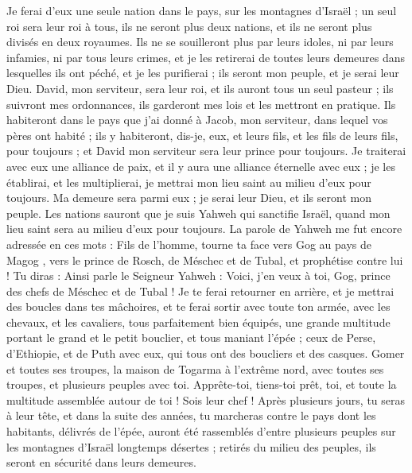 \begin{multicols}{2}
Je ferai d’eux une seule nation dans le pays, sur les montagnes d'Israël ; un seul roi sera leur roi à tous, ils ne seront plus deux nations, et ils ne seront plus divisés en deux royaumes.
Ils ne se souilleront plus par leurs idoles, ni par leurs infamies, ni par tous leurs crimes, et je les retirerai de toutes leurs demeures dans lesquelles ils ont péché, et je les purifierai ; ils seront mon peuple, et je serai leur Dieu.
David, mon serviteur, sera leur roi, et ils auront tous un seul pasteur ; ils suivront mes ordonnances, ils garderont mes lois et les mettront en pratique.
Ils habiteront dans le pays que j'ai donné à Jacob, mon serviteur, dans lequel vos pères ont habité ; ils y habiteront, dis-je, eux, et leurs fils, et les fils de leurs fils, pour toujours ; et David mon serviteur sera leur prince pour toujours.
Je traiterai avec eux une alliance de paix, et il y aura une alliance éternelle avec eux ; je les établirai, et les multiplierai, je mettrai mon lieu saint au milieu d'eux pour toujours.
Ma demeure sera parmi eux ; je serai leur Dieu, et ils seront mon peuple.
Les nations sauront que je suis Yahweh qui sanctifie Israël, quand mon lieu saint sera au milieu d'eux pour toujours.
\VerseOne{}La parole de Yahweh me fut encore adressée en ces mots :
Fils de l’homme, tourne ta face vers Gog au pays de Magog  , vers le prince de Rosch, de Méschec et de Tubal, et prophétise contre lui !
Tu diras : Ainsi parle le Seigneur Yahweh : Voici, j'en veux à toi, Gog, prince des chefs de Méschec et de Tubal !
Je te ferai retourner en arrière, et je mettrai des boucles dans tes mâchoires, et te ferai sortir avec toute ton armée, avec les chevaux, et les cavaliers, tous parfaitement bien équipés, une grande multitude portant le grand et le petit bouclier, et tous maniant l'épée ;
ceux de Perse, d’Ethiopie, et de Puth avec eux, qui tous ont des boucliers et des casques.
Gomer et toutes ses troupes, la maison de Togarma à l’extrême nord, avec toutes ses troupes, et plusieurs peuples avec toi.
Apprête-toi, tiens-toi prêt, toi, et toute la multitude assemblée autour de toi ! Sois leur chef !
Après plusieurs jours, tu seras à leur tête, et dans la suite des années, tu marcheras contre le pays dont les habitants, délivrés de l’épée, auront été rassemblés d’entre plusieurs peuples sur les montagnes d'Israël longtemps désertes ; retirés du milieu des peuples, ils seront en sécurité dans leurs demeures.

\end{multicols}
